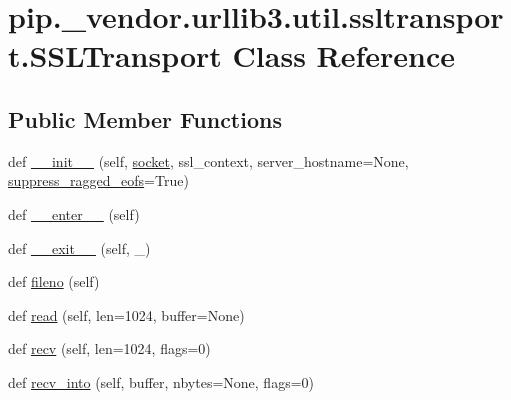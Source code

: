 \hypertarget{classpip_1_1__vendor_1_1urllib3_1_1util_1_1ssltransport_1_1SSLTransport}{}\section{pip.\+\_\+vendor.\+urllib3.\+util.\+ssltransport.\+S\+S\+L\+Transport Class Reference}
\label{classpip_1_1__vendor_1_1urllib3_1_1util_1_1ssltransport_1_1SSLTransport}
\subsection*{Public Member Functions}
\begin{DoxyCompactItemize}
\item 
def \hyperlink{classpip_1_1__vendor_1_1urllib3_1_1util_1_1ssltransport_1_1SSLTransport_a732f5816c7be7853f2549ffabbfdc1df}{\+\_\+\+\_\+init\+\_\+\+\_\+} (self, \hyperlink{classpip_1_1__vendor_1_1urllib3_1_1util_1_1ssltransport_1_1SSLTransport_a9640a56b99ad65bcfa066db295828c16}{socket}, ssl\+\_\+context, server\+\_\+hostname=None, \hyperlink{classpip_1_1__vendor_1_1urllib3_1_1util_1_1ssltransport_1_1SSLTransport_a50799ec6ecdc2f1cb81001e1d9fb1fdc}{suppress\+\_\+ragged\+\_\+eofs}=True)
\item 
def \hyperlink{classpip_1_1__vendor_1_1urllib3_1_1util_1_1ssltransport_1_1SSLTransport_afdffe017ff935c815b7b602ab667c128}{\+\_\+\+\_\+enter\+\_\+\+\_\+} (self)
\item 
def \hyperlink{classpip_1_1__vendor_1_1urllib3_1_1util_1_1ssltransport_1_1SSLTransport_a4c04ad8f30c18adf9c60c3cc30c2c6f9}{\+\_\+\+\_\+exit\+\_\+\+\_\+} (self, \+\_\+)
\item 
def \hyperlink{classpip_1_1__vendor_1_1urllib3_1_1util_1_1ssltransport_1_1SSLTransport_ac1795260a3c1b0157e74e24801e570d5}{fileno} (self)
\item 
def \hyperlink{classpip_1_1__vendor_1_1urllib3_1_1util_1_1ssltransport_1_1SSLTransport_ae42fe1ea6f153f83b9ceb515fa2f1f85}{read} (self, len=1024, buffer=None)
\item 
def \hyperlink{classpip_1_1__vendor_1_1urllib3_1_1util_1_1ssltransport_1_1SSLTransport_a0baef3cc0ff4501fb03d3679dc43b494}{recv} (self, len=1024, flags=0)
\item 
def \hyperlink{classpip_1_1__vendor_1_1urllib3_1_1util_1_1ssltransport_1_1SSLTransport_ac0ea8b928bb127a127c0879e909a3ffa}{recv\+\_\+into} (self, buffer, nbytes=None, flags=0)

\end{DoxyCompactItemize}
